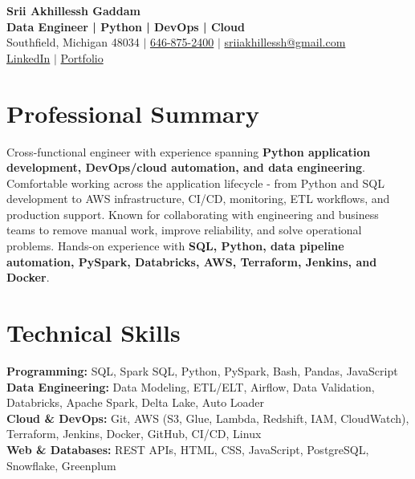 \documentclass[letterpaper,10pt]{article}
\begin{document}
\fontsize{9.35pt}{10.45pt}\selectfont

\begin{center}
    {\LARGE \textbf{Srii Akhillessh Gaddam}} \\[-1pt]
    \textbf{Data Engineer | Python | DevOps | Cloud} \\[2pt]
    Southfield, Michigan 48034 $|$
    \href{tel:6468752400}{646-875-2400} $|$
    \href{mailto:sriiakhillessh@gmail.com}{sriiakhillessh@gmail.com} \\[1pt]
    \href{https://www.linkedin.com/in/srii-akhiilessh-gaddam-b48668191/}{LinkedIn} $|$
    \href{https://sriiakhillesshg.github.io/portfolio/}{Portfolio}
\end{center}
\vspace{-8pt}

\section{Professional Summary}
\small{Cross-functional engineer with experience spanning \textbf{Python application development, DevOps/cloud automation, and data engineering}. Comfortable working across the application lifecycle - from Python and SQL development to AWS infrastructure, CI/CD, monitoring, ETL workflows, and production support. Known for collaborating with engineering and business teams to remove manual work, improve reliability, and solve operational problems. Hands-on experience with \textbf{SQL, Python, data pipeline automation, PySpark, Databricks, AWS, Terraform, Jenkins, and Docker}.}

\section{Technical Skills}
\small{
\textbf{Programming:} SQL, Spark SQL, Python, PySpark, Bash, Pandas, JavaScript \\
\textbf{Data Engineering:} Data Modeling, ETL/ELT, Airflow, Data Validation, Databricks, Apache Spark, Delta Lake, Auto Loader \\
\textbf{Cloud \& DevOps:} Git, AWS (S3, Glue, Lambda, Redshift, IAM, CloudWatch), Terraform, Jenkins, Docker, GitHub, CI/CD, Linux \\
\textbf{Web \& Databases:} REST APIs, HTML, CSS, JavaScript, PostgreSQL, Snowflake, Greenplum
}

\end{document}
